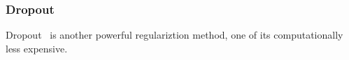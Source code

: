 \subsubsection{Dropout}

Dropout~\cite{JMLR:v15:srivastava14a} is another powerful regulariztion method, one of its  computationally less expensive. 